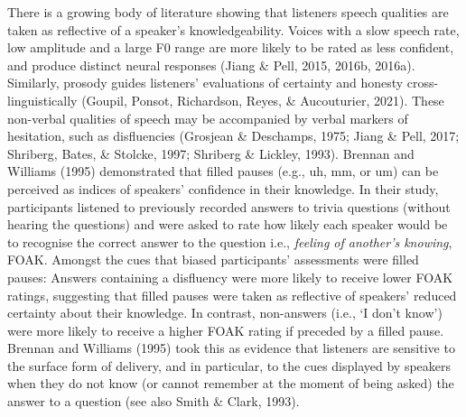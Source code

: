 \documentclass[
  man,floatsintext]{apa7}
\begin{document}
There is a growing body of literature showing that listeners speech qualities are taken as reflective of a speaker's knowledgeability. Voices with a slow speech rate, low amplitude and a large F0 range are more likely to be rated as less confident, and produce distinct neural responses (Jiang \& Pell, 2015, 2016b, 2016a). Similarly, prosody guides listeners' evaluations of certainty and honesty cross-linguistically (Goupil, Ponsot, Richardson, Reyes, \& Aucouturier, 2021). These non-verbal qualities of speech may be accompanied by verbal markers of hesitation, such as disfluencies (Grosjean \& Deschamps, 1975; Jiang \& Pell, 2017; Shriberg, Bates, \& Stolcke, 1997; Shriberg \& Lickley, 1993). Brennan and Williams (1995) demonstrated that filled pauses (e.g., uh, mm, or um) can be perceived as indices of speakers' confidence in their knowledge. In their study, participants listened to previously recorded answers to trivia questions (without hearing the questions) and were asked to rate how likely each speaker would be to recognise the correct answer to the question i.e., \emph{feeling of another's knowing}, FOAK. Amongst the cues that biased participants' assessments were filled pauses: Answers containing a disfluency were more likely to receive lower FOAK ratings, suggesting that filled pauses were taken as reflective of speakers' reduced certainty about their knowledge. In contrast, non-answers (i.e., `I don't know') were more likely to receive a higher FOAK rating if preceded by a filled pause. Brennan and Williams (1995) took this as evidence that listeners are sensitive to the surface form of delivery, and in particular, to the cues displayed by speakers when they do not know (or cannot remember at the moment of being asked) the answer to a question (see also Smith \& Clark, 1993).
\end{document}
